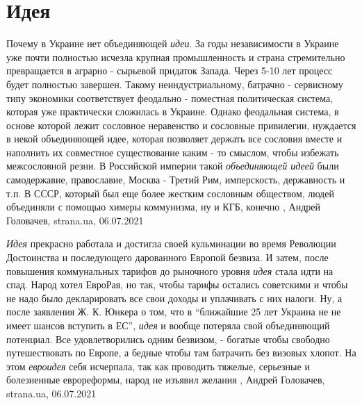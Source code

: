  
 
 
 
 
\chapter{Идея}

Почему в Украине нет объединяющей \emph{идеи}.  За годы независимости в Украине
уже почти полностью исчезла крупная промышленность и страна стремительно
превращается в аграрно - сырьевой придаток Запада. Через 5-10 лет процесс будет
полностью завершен. Такому неиндустриальному, батрачно - сервисному типу
экономики соответствует феодально - поместная политическая система, которая уже
практически сложилась в Украине.  Однако феодальная система, в основе которой
лежит сословное неравенство и сословные привилегии, нуждается в некой
объединяющей идее, которая позволяет держать все сословия вместе и наполнить их
совместное существование каким - то смыслом, чтобы избежать межсословной резни.
В Российской империи такой \emph{объединяющей идеей} были самодержавие,
православие, Москва - Третий Рим, имперскость, державность и т.п.  В СССР,
который был еще более жестким сословным обществом, людей объединяли с помощью
химеры коммунизма, ну и КГБ, конечно
, 
Андрей Головачев, strana.ua, 06.07.2021

\emph{Идея} прекрасно работала и достигла своей кульминации во время Революции
Достоинства и последующего дарованного Европой безвиза. И затем, после
повышения коммунальных тарифов до рыночного уровня \emph{идея} стала идти на спад.
Народ хотел ЕвроРая, но так, чтобы тарифы остались советскими и чтобы не надо
было декларировать все свои доходы и уплачивать с них налоги. Ну, а после
заявления Ж. К. Юнкера о том, что в \enquote{ближайшие 25 лет Украина не не имеет
шансов вступить в ЕС}, \emph{идея} и вообще потеряла свой объединяющий потенциал. Все
удовлетворились одним безвизом, - богатые чтобы свободно путешествовать по
Европе, а бедные чтобы там батрачить без визовых хлопот. На этом \emph{евроидея} себя
исчерпала, так как проводить тяжелые, серьезные и болезненные еврореформы,
народ не изъявил желания
, 
Андрей Головачев, strana.ua, 06.07.2021

